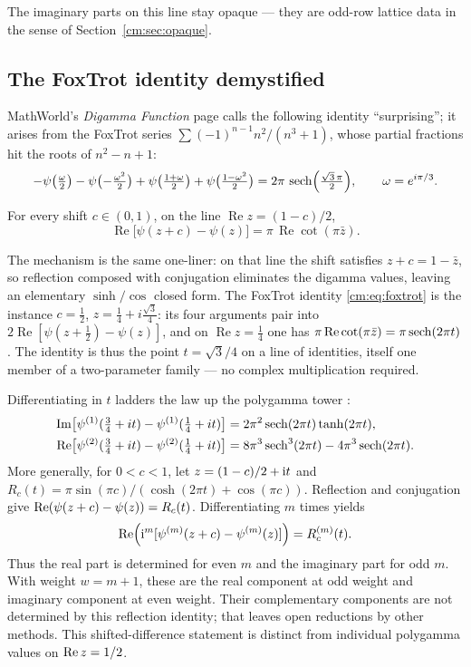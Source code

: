 The imaginary parts on this line stay opaque --- they are odd-row lattice data in the sense of
Section~\ref{cm:sec:opaque}.

\subsection{The FoxTrot identity demystified}

MathWorld's \emph{Digamma Function} page \cite{cm:MathWorldDigamma} calls the following
identity ``surprising''; it arises from the FoxTrot series $\sum(-1)^{n-1}n^2/(n^3+1)$,
whose partial fractions hit the roots of $n^2-n+1$:
\begin{equation}\label{cm:eq:foxtrot}
-\psi\bigl(\tfrac{\omega}{2}\bigr)-\psi\bigl(-\tfrac{\omega^2}{2}\bigr)
+\psi\bigl(\tfrac{1+\omega}{2}\bigr)+\psi\bigl(\tfrac{1-\omega^2}{2}\bigr)
=2\pi\,\operatorname{sech}\Bigl(\tfrac{\sqrt3\,\pi}{2}\Bigr),\qquad \omega=e^{i\pi/3}.
\end{equation}

\begin{law}\label{cm:law:lineline}
For every shift $c\in(0,1)$, on the line $\operatorname{Re}z=(1-c)/2$,
\[
\operatorname{Re}\bigl[\psi(z+c)-\psi(z)\bigr]=\pi\,\operatorname{Re}\cot(\pi\bar z).
\]
\end{law}

The mechanism is the same one-liner: on that line the shift satisfies $z+c=1-\bar z$, so
reflection composed with conjugation eliminates the digamma values, leaving an elementary
$\sinh/\cos$ closed form. The FoxTrot identity \eqref{cm:eq:foxtrot} is the instance
$c=\tfrac12$, $z=\tfrac14+i\tfrac{\sqrt3}{4}$: its four arguments pair into
$2\operatorname{Re}[\psi(z+\tfrac12)-\psi(z)]$, and on $\operatorname{Re}z=\tfrac14$ one has
$\pi\operatorname{Re}\cot(\pi\bar z)=\pi\operatorname{sech}(2\pi t)$. The identity is thus the point
$t=\sqrt3/4$ on a line of identities, itself one member of a two-parameter family --- no
complex multiplication required.

Differentiating in $t$ ladders the law up the polygamma tower
:
\begin{align*}
\operatorname{Im}\bigl[\psi^{(1)}(\tfrac34+it)-\psi^{(1)}(\tfrac14+it)\bigr]
&=2\pi^2\operatorname{sech}(2\pi t)\tanh(2\pi t),\\
\operatorname{Re}\bigl[\psi^{(2)}(\tfrac34+it)-\psi^{(2)}(\tfrac14+it)\bigr]
&=8\pi^3\operatorname{sech}^3(2\pi t)-4\pi^3\operatorname{sech}(2\pi t).
\end{align*}
More generally, for $0<c<1$, let $z=(1-c)/2+\mathrm{i} t$ and
$R_c(t)=\pi\sin(\pi c)/(\cosh(2\pi t)+\cos(\pi c))$.
Reflection and conjugation give $\operatorname{Re}(\psi(z+c)-\psi(z))=R_c(t)$.
Differentiating $m$ times yields
\[
 \operatorname{Re}\!\left(\mathrm{i}^m[\psi^{(m)}(z+c)-\psi^{(m)}(z)]\right)=R_c^{(m)}(t).
\]
Thus the real part is determined for even $m$ and the imaginary part for odd
$m$. With weight $w=m+1$, these are the real component at odd weight and
imaginary component at even weight. Their complementary components are not
determined by this reflection identity; that leaves open reductions by other
methods. This shifted-difference statement is distinct from individual
polygamma values on $\operatorname{Re} z=1/2$.

